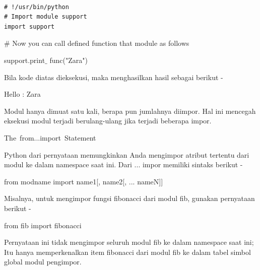 \vspace{\baselineskip}
\begin{verbatim}

# !/usr/bin/python
# Import module support
import support

\end{verbatim}

\vspace{\baselineskip}
\noindent $\#$  Now you can call defined function that module as follows\par

\noindent support.print$ \_ $ func("Zara")\par

\vspace{\baselineskip}
\noindent Bila kode diatas dieksekusi, maka menghasilkan hasil sebagai berikut -\par
\vspace{\baselineskip}
\noindent Hello : Zara\par

\vspace{\baselineskip}
\noindent Modul hanya dimuat satu kali, berapa pun jumlahnya diimpor. Hal ini mencegah eksekusi modul terjadi berulang-ulang jika terjadi beberapa impor.\par

\vspace{\baselineskip}
\noindent The from...import Statement\par

\vspace{\baselineskip}
\noindent Python dari pernyataan memungkinkan Anda mengimpor atribut tertentu dari modul ke dalam namespace saat ini. Dari ... impor memiliki sintaks berikut -\par


\vspace{\baselineskip}
\noindent from modname import name1[, name2[, ... nameN]]\par


\vspace{\baselineskip}
\noindent Misalnya, untuk mengimpor fungsi fibonacci dari modul fib, gunakan pernyataan berikut -\par

\vspace{\baselineskip}
\vspace{\baselineskip}
\noindent from fib import fibonacci\par

\vspace{\baselineskip}
\noindent Pernyataan ini tidak mengimpor seluruh modul fib ke dalam namespace saat ini; Itu hanya memperkenalkan item fibonacci dari modul fib ke dalam tabel simbol global modul pengimpor.\par


